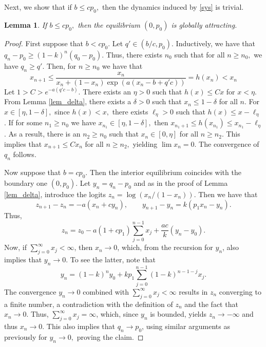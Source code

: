 \documentclass{article}
\theoremstyle{plain}
\newtheorem{lemma}{Lemma}
\theoremstyle{definition}
\begin{document}
Next, we show that if $b\leq cp_0,$ then the dynamics induced by \eqref{sys} is trivial.
\begin{lemma}\label{lem1}
If $b\leq cp_0,$ then the equilibrium $(0,p_0)$ is globally attracting.
\end{lemma}

\begin{proof}
First suppose that $b<cp_0$. Let $q'\in(b/c,p_0).$ Inductively, we have that $q_n-p_0\geq (1-k)^n(q_0-p_0).$ Thus, there exists $n_0$ such that for all $n\geq n_0,$ we have $q_n\geq q'.$ Then, for $n\geq n_0$ we have that
\[
x_{n+1}\leq\frac{x_{n}}{x_{n}+(1-x_{n}) \exp{\left(a(x_n-b+q'c) \right)}}=h(x_n)<x_n
\]
Let $1>C>e^{-a(q'c-b)}$. There exists an $\eta>0$ such that $h(x)\leq Cx$ for $x< \eta.$ From Lemma \ref{lem_delta}, there exists a $\delta>0$ such that $x_n\leq 1-\delta$ for all $n$. For $x\in[\eta,1-\delta],$ since $h(x)<x,$ there exists $\ell_\eta>0$ such that $h(x)\leq x- \ell_\eta$. If for some $n_1\geq n_0$ we have $x_{n_1} \in [\eta, 1-\delta],$ then $x_{n_1+1}\leq h(x_{n_1})\leq x_{n_1} -\ell_\eta$. As a result, there is an $n_2\geq n_0$ such that $x_n \in [0,\eta]$ for all $n\geq n_2.$ This implies that $x_{n+1}\leq Cx_n$ for all $n\geq n_2,$ yielding $\lim x_n =0.$ The convergence of $q_n$ follows.

Now suppose that $b=cp_0.$ Then the interior equilibrium coincides with the boundary one $(0,p_0).$ Let $y_n=q_n-p_0$ and as in the proof of Lemma \ref{lem_delta}, introduce the logits $z_n=\log \left(x_n/(1-x_n) \right).$ Then we have that
\[
z_{n+1}-z_n=-a(x_n+cy_n), \qquad  y_{n+1}-y_n=k(p_1x_n-y_n).
\]
Thus,
\[
z_n=z_0-a(1+cp_1)\sum_{j=0}^{n-1}x_j +\frac{ac}{k}(y_n-y_0).
\]
Now, if $\sum_{j=0}^{\infty}x_j <\infty$, then $x_n\to 0$, which, from the recursion for $y_n$, also implies that $y_n\to0$. To see the latter, note that 
\[
y_n=(1-k)^n y_0+kp_1\sum_{j=0}^{n-1}(1-k)^{n-1-j}x_j.
\]
The convergence $y_n \to 0$ combined with $\sum_{j=0}^{\infty}x_j <\infty$ results in $z_n$ converging to a finite number, a contradiction with the definition of $z_n$ and the fact that $x_n\to 0.$ Thus, $\sum_{j=0}^{\infty}x_j =\infty$, which, since $y_n$ is bounded, yields $z_n \to -\infty$ and thus $x_n\to 0$. This also implies that $q_n \to p_0$, using similar arguments as previously for $y_n\to 0,$ proving the claim.



\end{proof}
\end{document}
